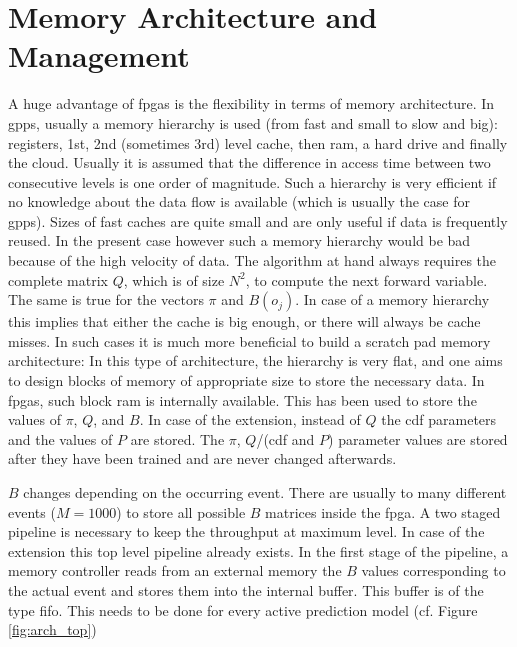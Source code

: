 \documentclass[mscthesis]{usiinfthesis}
\begin{document}
\section{Memory Architecture and Management}
\label{ch:design_mem}

A huge advantage of \glspl{fpga} is the flexibility in terms of memory
architecture. In \glspl{gpp}, usually a memory hierarchy is used (from fast and
small to slow and big): registers, 1st, 2nd (sometimes 3rd) level cache, then
\gls{ram}, a hard drive and finally the cloud. Usually it is assumed that the
difference in access time between two consecutive levels is one order of
magnitude. Such a hierarchy is very efficient if no knowledge about the data
flow is available (which is usually the case for \glspl{gpp}). Sizes of fast
caches are quite small and are only useful if data is frequently reused. In the
present case however such a memory hierarchy would be bad because of the
high velocity of data. The algorithm at hand always requires the complete
matrix $Q$, which is of size $N^2$, to compute the next forward variable. The
same is true for the vectors $\pi$ and $B(o_j)$. In case of a memory hierarchy
this implies that either the cache is big enough, or there will always be
cache misses. In such cases it is much more beneficial to build a scratch pad
memory architecture: In this type of architecture, the hierarchy is very flat,
and one aims to design blocks of memory of appropriate size to store the
necessary data. In \glspl{fpga}, such block ram is internally available. This
has been used to store the values of $\pi$, $Q$, and $B$. In case of the
extension, instead of $Q$ the \gls{cdf} parameters and the values of $P$ are
stored. The $\pi$, $Q$/(\gls{cdf} and $P$) parameter values are stored after
they have been trained and are never changed afterwards.

$B$ changes depending on the occurring event. There are usually to many
different events ($M=1000$) to store all possible $B$ matrices inside the
\gls{fpga}. A two staged pipeline is necessary to keep the throughput at
maximum level. In case of the extension this top level pipeline already
exists. In the first stage of the pipeline, a memory controller reads from an
external memory the $B$ values corresponding to the actual event and stores
them into the internal buffer. This buffer is of the type \gls{fifo}. This
needs to be done for every active prediction model (cf. Figure
\ref{fig:arch_top})
\end{document}
